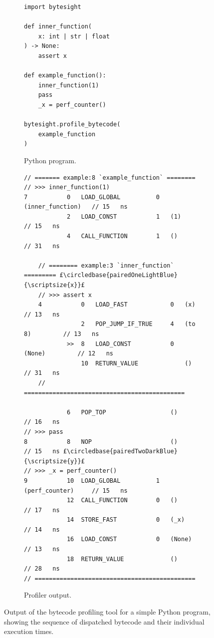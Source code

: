 \begin{figure}[H]
    \centering
    \begin{subfigure}[b]{0.275\textwidth}
       \centering
        \begin{verbatim}
import bytesight

def inner_function(
    x: int | str | float
) -> None:
    assert x

def example_function():
    inner_function(1)
    pass
    _x = perf_counter()

bytesight.profile_bytecode(
    example_function
)
        \end{verbatim}
        \footnotesize\vspace{6em}
        \caption{Python program.}
        \label{listing:profiler-example-python}
    \end{subfigure}
    \hfill
    \begin{subfigure}[b]{0.695\textwidth}
        \centering
        \begin{verbatim}
// ======= example:8 `example_function` ========
// >>> inner_function(1)
7           0   LOAD_GLOBAL          0   (inner_function)   // 15   ns
            2   LOAD_CONST           1   (1)                // 15   ns
            4   CALL_FUNCTION        1   ()                 // 31   ns

    // ======== example:3 `inner_function` ========= £\circledbase{pairedOneLightBlue}{\scriptsize{x}}£
    // >>> assert x
    4           0   LOAD_FAST            0   (x)            // 13   ns
                2   POP_JUMP_IF_TRUE     4   (to 8)         // 13   ns
            >>  8   LOAD_CONST           0   (None)         // 12   ns
                10  RETURN_VALUE             ()             // 31   ns
    // =============================================

            6   POP_TOP                  ()                 // 16   ns
// >>> pass
8           8   NOP                      ()                 // 15   ns £\circledbase{pairedTwoDarkBlue}{\scriptsize{y}}£
// >>> _x = perf_counter()
9           10  LOAD_GLOBAL          1   (perf_counter)     // 15   ns
            12  CALL_FUNCTION        0   ()                 // 17   ns
            14  STORE_FAST           0   (_x)               // 14   ns
            16  LOAD_CONST           0   (None)             // 13   ns
            18  RETURN_VALUE             ()                 // 28   ns
// =============================================
        \end{verbatim}
        \caption{Profiler output.}
        \label{listing:profiler-example-bytecode}
    \end{subfigure}
    \vspace{1em}
    \captionsetup{name=Listing}
    \caption{Output of the bytecode profiling tool for a simple Python program, showing the sequence of dispatched bytecode and their individual execution times.}
    \label{listing:profiler-example}
\end{figure}


